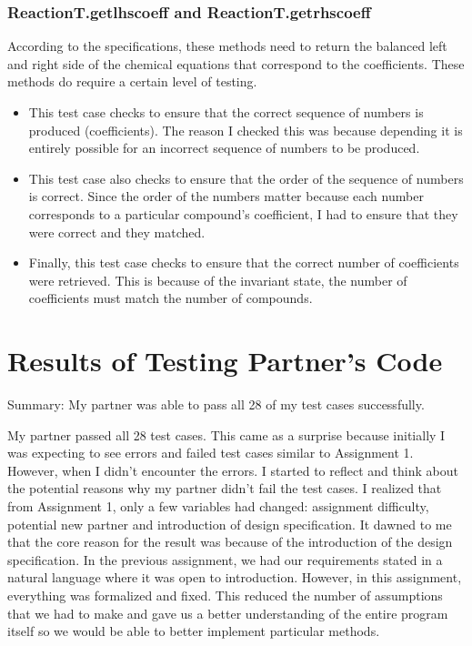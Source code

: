 \documentclass[12pt]{article}
\begin{document}
\subsubsection{ReactionT.get\textunderscore lhs\textunderscore coeff and ReactionT.get\textunderscore rhs\textunderscore coeff}
According to the specifications, these methods need to return the balanced left and right side of the chemical equations that correspond to the coefficients.
These methods do require a certain level of testing.

\begin{itemize}
  \item This test case checks to ensure that the correct sequence of numbers is produced (coefficients). The reason I checked this was because depending it is entirely possible for
  an incorrect sequence of numbers to be produced. 
  \item This test case also checks to ensure that the order of the sequence of numbers is correct. Since the order of the numbers matter because each number corresponds to a particular 
  compound's coefficient, I had to ensure that they were correct and they matched.
  \item Finally, this test case checks to ensure that the correct number of coefficients were retrieved. This is because of the invariant state, the number of coefficients must match the number
  of compounds.
\end{itemize}




\section{Results of Testing Partner's Code}

Summary: My partner was able to pass all 28 of my test cases successfully.

My partner passed all 28 test cases. This came as a surprise because initially I was expecting to see errors and failed test cases similar to Assignment 1.
However, when I didn't encounter the errors. I started to reflect and think about the potential reasons why my partner didn't fail the test cases.
I realized that from Assignment 1, only a few variables had changed: assignment difficulty, potential new partner and introduction of design specification.
It dawned to me that the core reason for the result was because of the introduction of the design specification. In the previous assignment, we had our requirements
stated in a natural language where it was open to introduction. However, in this assignment, everything was formalized and fixed. This reduced the number of assumptions
that we had to make and gave us a better understanding of the entire program itself so we would be able to better implement particular methods.
\end{document}
